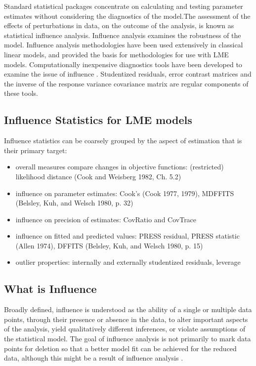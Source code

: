 \documentclass[Main.tex]{subfiles}
\begin{document}
Standard statistical packages concentrate on calculating and testing parameter estimates without considering the diagnostics of the model.The assessment of the effects of perturbations in data, on the outcome of the analysis, is known as statistical influence analysis. Influence analysis examines the robustness of the model. Influence analysis methodologies have been used extensively in classical linear models, and provided the basis for methodologies for use with LME models.
Computationally inexpensive diagnostics tools have been developed to examine the issue of influence \citep{Zewotir}.
Studentized residuals, error contrast matrices and the inverse of the response variance covariance matrix are regular components of these tools.


\subsection{Influence Statistics for LME models} %
Influence statistics can be coarsely grouped by the aspect of estimation that is their primary target:
\begin{itemize}
\item overall measures compare changes in objective functions: (restricted) likelihood distance (Cook and Weisberg 1982, Ch. 5.2)
\item influence on parameter estimates: Cook's  (Cook 1977, 1979), MDFFITS (Belsley, Kuh, and Welsch 1980, p. 32)
\item influence on precision of estimates: CovRatio and CovTrace
\item influence on fitted and predicted values: PRESS residual, PRESS statistic (Allen 1974), DFFITS (Belsley, Kuh, and Welsch 1980, p. 15)
\item outlier properties: internally and externally studentized residuals, leverage
\end{itemize}




\subsection{What is Influence} %


Broadly defined, influence is understood as the ability of a single or multiple data points, through their presence or absence in the data, to alter important aspects of the analysis, yield qualitatively different inferences, or violate assumptions of the statistical model. The goal of influence analysis is not primarily to mark data
points for deletion so that a better model fit can be achieved for the reduced data, although this might be a result of influence analysis \citep{schabenberger}.
\end{document}
